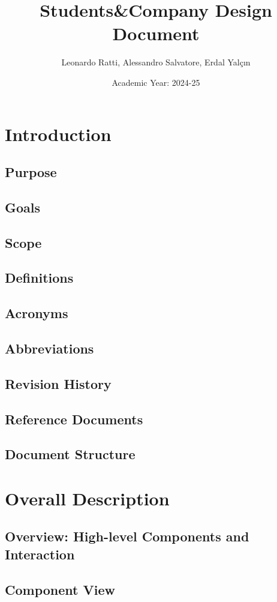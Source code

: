 \documentclass[a4paper,12pt]{article}
\title{Students\&Company Design Document}
\author{Leonardo Ratti, Alessandro Salvatore, Erdal Yalçın}
\date{Academic Year: 2024-25}
\begin{document}
\maketitle

\tableofcontents
\newpage

\section{Introduction}
\subsection{Purpose}
\subsection{Goals}
\subsection{Scope}
\subsection{Definitions}
\subsection{Acronyms}
\subsection{Abbreviations}
\subsection{Revision History}
\subsection{Reference Documents}
\subsection{Document Structure}

\section{Overall Description}
\subsection{Overview: High-level Components and Interaction}
\subsection{Component View}
\end{document}
